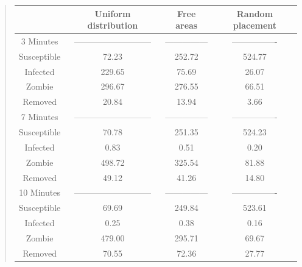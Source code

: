 \documentclass[%
twoside,                 %
final,                   %
10pt]{article}
\begin{document}
\begin{quote}
\begin{tabular}{cccc}
\hline
\multicolumn{1}{c}{  } & \multicolumn{1}{c}{ Uniform distribution } & \multicolumn{1}{c}{ Free areas } & \multicolumn{1}{c}{ Random placement } \\
\hline
3 Minutes                   & --------------------------- & ---------------             & ----------------            \\
\hline
Susceptible                 & 72.23                       & 252.72                      & 524.77                      \\
Infected                    & 229.65                      & 75.69                       & 26.07                       \\
Zombie                      & 296.67                      & 276.55                      & 66.51                       \\
Removed                     & 20.84                       & 13.94                       & 3.66                        \\
\hline
7 Minutes                   & --------------------------- & ---------------             & ----------------            \\
\hline
Susceptible                 & 70.78                       & 251.35                      & 524.23                      \\
Infected                    & 0.83                        & 0.51                        & 0.20                        \\
Zombie                      & 498.72                      & 325.54                      & 81.88                       \\
Removed                     & 49.12                       & 41.26                       & 14.80                       \\
\hline
10 Minutes                  & --------------------------- & ---------------             & ----------------            \\
\hline
Susceptible                 & 69.69                       & 249.84                      & 523.61                      \\
Infected                    & 0.25                        & 0.38                        & 0.16                        \\
Zombie                      & 479.00                      & 295.71                      & 69.67                       \\
Removed                     & 70.55                       & 72.36                       & 27.77                       \\
\hline
\end{tabular}
\end{quote}
\end{document}
